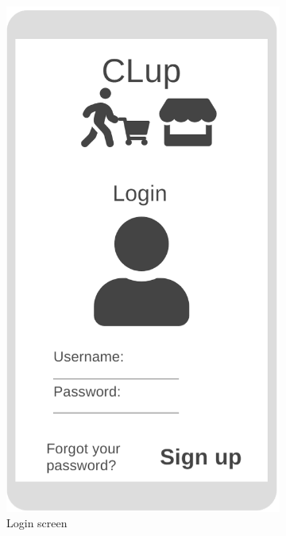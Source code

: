 \begin{figure}[h!]
	\centering
	\begin{subfigure}[b]{0.3\textwidth}
		\includegraphics[width=\linewidth]{../Diagrams/WireframesCLup/Login.png}
		\caption{Login screen}
		\label{fig:WfLogin}
	\end{subfigure}
	\hspace{1em}
	\begin{subfigure}[b]{0.3\textwidth}

\end{subfigure}
\end{figure}
